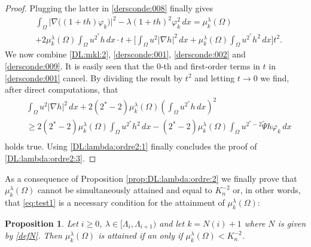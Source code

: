 \documentclass[10pt]{amsart}
\numberwithin{equation}{section}
\newcommand{\vp}{\varphi}
\newcommand{\Om}{\Omega}
\newcommand{\mkl}{\mu_{k}^{\lambda}}
\theoremstyle{plain}
\newtheorem{prop}{Proposition}[section]%
\theoremstyle{remark}
\begin{document}
\begin{proof}
Plugging the latter in \eqref{dersconde:008} finally gives 
   \begin{equation} \label{dersconde:009}
\begin{aligned}
& \int_{\Om}  \big|\nabla \big( (1+th) \vp_k \big)  \big|^2 - \lambda (1+th)^2 \vp_k^2 \, dx = \mkl(\Om) \\
&+2 \mkl(\Om) \int_\Om u^{2^*} h \, dx \cdot t  + \Bigg[ \int_{\Om} u^2 |\nabla h|^2 \, dx + \mkl(\Om)  \int_{\Om} u^{2^*} h^2 \, dx  \Bigg] t^2.
 \end{aligned} 
 \end{equation}
We now combine \eqref{DL:mkl:2}, \eqref{dersconde:001}, \eqref{dersconde:002} and \eqref{dersconde:009}. It is easily seen that the $0$-th and first-order terms in $t$ in \eqref{dersconde:001} cancel. By dividing the result by $t^2$ and letting $t \to 0$ we find, after direct computations, that 
   \begin{equation} \label{dersconde:10}
\begin{aligned}
& \int_{\Om} u^2 |\nabla h|^2 \, dx + 2(2^*-2) \mkl(\Om) \left( \int_\Om u^{2^*} h \, dx \right)^2 \\
& \ge 2 (2^*-2) \mkl(\Om) \int_{\Om} u^{2^*} h^2 \, dx - (2^*-2) \mkl(\Om) \int_{\Om} u^{2^*-2} \tilde{\Psi} h \vp_k \, dx \\
 \end{aligned} 
 \end{equation}
holds true. Using \eqref{DL:lambda:ordre2:1} finally concludes the proof of \eqref{DL:lambda:ordre2:3}. 
 \end{proof}

As a consequence of Proposition \ref{prop:DL:lambda:ordre:2} we finally prove that $\mkl(\Om)$ cannot be simultaneously attained and equal to $K_n^{-2}$ or, in other words, that \eqref{eq:test1} is a necessary condition for the attainment of $\mkl(\Om)$:

\begin{prop} \label{prop:optimalite:Kn}
Let $i \ge 0$, $\lambda \in [\Lambda_i, \Lambda_{i+1})$ and let $k = N(i)+1$ where $N$ is given by \eqref{defN}. Then $\mkl(\Om)$ is attained if an only if $\mkl(\Om) < K_n^{-2}$. 
\end{prop}
\end{document}
